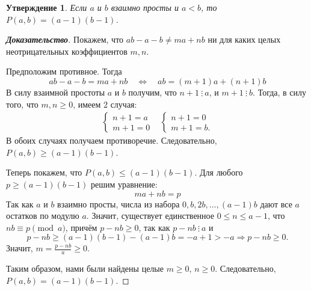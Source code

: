 \documentclass[12pt]{article}
\newtheorem{proposition}[theorem]{Утверждение}
\theoremstyle{definition}
\begin{document}
\begin{proposition}
Если $a$ и $b$ взаимно просты и $a < b$, то $P(a, b) = (a - 1)(b - 1)$.
\end{proposition}
\begin{proof}[\textbf{Доказательство}]
Покажем, что $ab - a - b \ne ma + nb$ ни для каких целых неотрицательных коэффициентов $m, n$.

Предположим противное. Тогда \begin{equation*}
ab - a - b = ma + nb \quad \Longleftrightarrow \quad ab = (m + 1)a + (n + 1) b
\end{equation*}
В силу взаимной простоты $a$ и $b$ получим, что $n + 1 \ \vdots \ a$, и $m + 1 \ \vdots \ b$. Тогда, в силу того, что $m, n \ge 0$, имеем $2$ случая:\begin{align*}
     \begin{cases}
        n + 1 = a\\
        m + 1 = 0
    \end{cases}
    &
    \begin{cases}
        n + 1 = 0\\
        m + 1 = b.
    \end{cases}
\end{align*}
В обоих случаях получаем противоречие. Следовательно, $P(a, b) \ge (a - 1)(b - 1)$.

Теперь покажем, что $P(a, b) \le (a - 1)(b - 1)$. Для любого $p \ge (a - 1)(b - 1)$ решим уравнение: \begin{equation*}
ma + nb = p
\end{equation*}
Так как $a$ и $b$ взаимно просты, числа из набора $0, b, 2b, \dots, (a - 1)b$ дают все $a$ остатков по модулю $a$. Значит, существует единственное $0 \le n \le a - 1$, что $nb \equiv p \pmod a$, причём $p - nb \ge 0$, так как $p - nb \ \vdots \ a$ и
\begin{equation*}
p - nb \ge (a - 1)(b - 1) - (a - 1)b = -a + 1 > -a \Longrightarrow p - nb \ge 0.
\end{equation*}
Значит, $m = \frac{p - nb}{a} \ge 0$.

Таким образом, нами были найдены целые $m \ge 0$, $n \ge 0$. Следовательно, $P(a, b) = (a - 1)(b - 1)$.
\end{proof}
\end{document}
